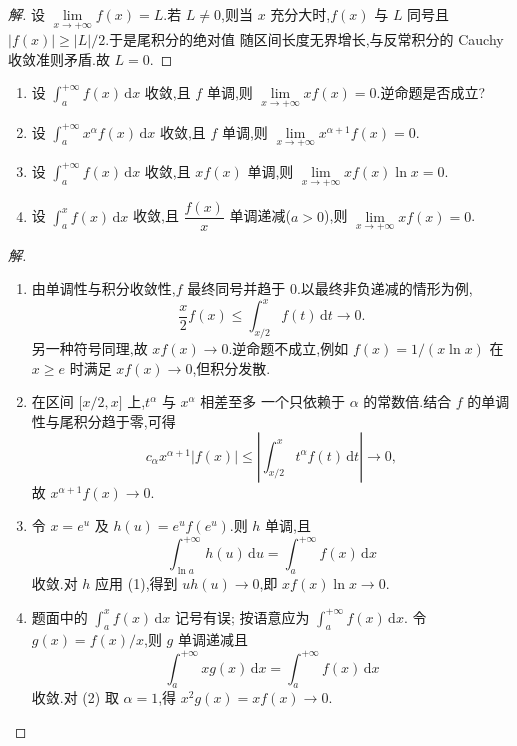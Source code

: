 \documentclass[../../数学分析培优讲义(答案版).tex]{subfiles}
\begin{document}
\begin{proof}[解]
设 $\displaystyle\lim\limits_{x\to+\infty}f(x)=L$.若 $L\neq0$,则当 $x$
充分大时,$f(x)$ 与 $L$ 同号且 $|f(x)|\geq|L|/2$.于是尾积分的绝对值
随区间长度无界增长,与反常积分的 Cauchy 收敛准则矛盾.故 $L=0$.
\end{proof}

\begin{example}
\begin{enumerate}[label=(\arabic*)]
    \item 设 $\displaystyle\int_a^{+\infty}f(x)\,\mathrm{d}x$ 收敛,且 $f$ 单调,则 $\displaystyle\lim\limits_{x\to+\infty}xf(x)=0$.逆命题是否成立?
    \item 设 $\displaystyle\int_a^{+\infty}x^\alpha f(x)\,\mathrm{d}x$ 收敛,且 $f$ 单调,则 $\displaystyle\lim\limits_{x\to+\infty}x^{\alpha+1}f(x)=0$.
    \item 设 $\displaystyle\int_a^{+\infty}f(x)\,\mathrm{d}x$ 收敛,且 $xf(x)$ 单调,则 $\displaystyle\lim\limits_{x\to+\infty}xf(x)\ln x=0$.
    \item 设 $\displaystyle\int_a^x f(x)\,\mathrm{d}x$ 收敛,且 $\dfrac{f(x)}{x}$ 单调递减($a>0$),则 $\displaystyle\lim\limits_{x\to+\infty}xf(x)=0$.
\end{enumerate}
\end{example}

\begin{proof}[解]
\begin{enumerate}[label=(\arabic*)]
    \item 由单调性与积分收敛性,$f$ 最终同号并趋于 $0$.以最终非负递减的情形为例,
    \[
        \dfrac{x}{2}f(x)\leq\int_{x/2}^xf(t)\,\mathrm{d}t\longrightarrow0.
    \]
    另一种符号同理,故 $xf(x)\to0$.逆命题不成立,例如
    $f(x)=1/(x\ln x)$ 在 $x\geq e$ 时满足 $xf(x)\to0$,但积分发散.

    \item 在区间 $\lbrack x/2,x\rbrack$ 上,$t^\alpha$ 与 $x^\alpha$ 相差至多
    一个只依赖于 $\alpha$ 的常数倍.结合 $f$ 的单调性与尾积分趋于零,可得
    \[
        c_\alpha x^{\alpha+1}|f(x)|
        \leq\left|\int_{x/2}^xt^\alpha f(t)\,\mathrm{d}t\right|\longrightarrow0,
    \]
    故 $x^{\alpha+1}f(x)\to0$.

    \item 令 $x=e^u$ 及 $h(u)=e^u f(e^u)$.则 $h$ 单调,且
    \[
        \int_{\ln a}^{+\infty}h(u)\,\mathrm{d}u
        =\int_a^{+\infty}f(x)\,\mathrm{d}x
    \]
    收敛.对 $h$ 应用 (1),得到 $u h(u)\to0$,即
    $xf(x)\ln x\to0$.

    \item 题面中的 $\displaystyle\int_a^x f(x)\,\mathrm{d}x$ 记号有误;
    按语意应为 $\displaystyle\int_a^{+\infty}f(x)\,\mathrm{d}x$.
    令 $g(x)=f(x)/x$,则 $g$ 单调递减且
    \[
        \int_a^{+\infty}xg(x)\,\mathrm{d}x
        =\int_a^{+\infty}f(x)\,\mathrm{d}x
    \]
    收敛.对 (2) 取 $\alpha=1$,得 $x^2g(x)=xf(x)\to0$.
\end{enumerate}
\end{proof}
\end{document}
